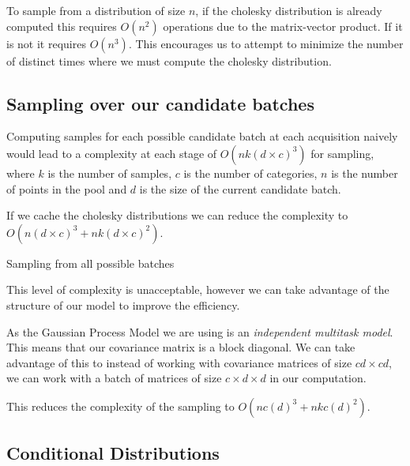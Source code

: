 \documentclass[12pt, a4paper]{report}
\theoremstyle{definition}
\theoremstyle{definition}
\theoremstyle{definition}
\begin{document}
To sample from a distribution of size $n$, if the cholesky distribution is already computed this requires $O(n^2)$ operations due to the matrix-vector product. If it is not it requires $O(n^3)$. This encourages us to attempt to minimize the number of distinct times where we must compute the cholesky distribution.


\subsection{Sampling over our candidate batches}

Computing samples for each possible candidate batch at each acquisition naively would lead to a complexity at each stage of $O\left(n k (d \times c)^3 \right)$ for sampling, where $k$ is the number of samples, $c$ is the number of categories, $n$ is the number of points in the pool and $d$ is the size of the current candidate batch.

If we cache the cholesky distributions we can reduce the complexity to $O(n (d \times c)^3  + n k (d \times c)^2)$.

\begin{algorithm}[H]
    \SetAlgoLined
     \caption{Sampling from all possible batches}
\end{algorithm}

This level of complexity is unacceptable, however we can take advantage of the structure of our model to improve the efficiency.

As the Gaussian Process Model we are using is an \textit{independent multitask model}. This means that our covariance matrix is a block diagonal. We can take advantage of this to instead of working with covariance matrices of size $ cd \times cd $, we can work with a batch of matrices of size $c \times d \times d$ in our computation.


This reduces the complexity of the sampling to $O(n c (d)^3  + n k c (d)^2)$.

\subsection{Conditional Distributions}
\end{document}
